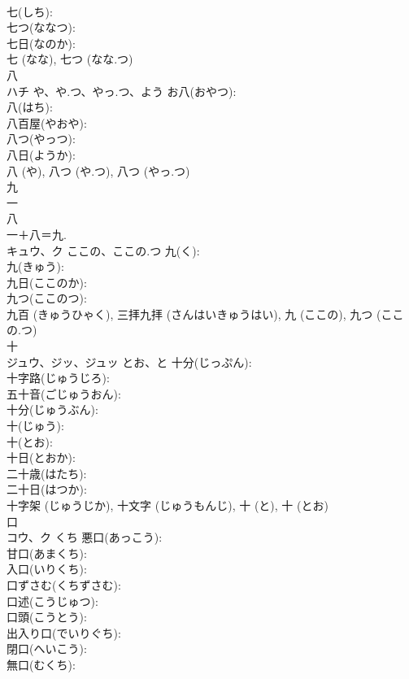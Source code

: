 \documentclass[8pt]{extreport}
\begin{document}
\begin{CJK}{UTF8}{min}
\\	七(しち): 
\\	七つ(ななつ): 
\\	七日(なのか): 
\\	七 (なな), 七つ (なな.つ)
\\	八			
\\	ハチ	や、や.つ、やっ.つ、よう	お八(おやつ): 
\\	八(はち): 
\\	八百屋(やおや): 
\\	八つ(やっつ): 
\\	八日(ようか): 
\\	八 (や), 八つ (や.つ), 八つ (やっ.つ)
\\	九			
\\	一 
\\	八
\\	一＋八＝九.	
\\	キュウ、ク	ここの、ここの.つ	九(く): 
\\	九(きゅう): 
\\	九日(ここのか): 
\\	九つ(ここのつ): 
\\	九百 (きゅうひゃく), 三拝九拝 (さんはいきゅうはい), 九 (ここの), 九つ (ここの.つ)
\\	十			
\\	ジュウ、ジッ、ジュッ	とお、と	十分(じっぷん): 
\\	十字路(じゅうじろ): 
\\	五十音(ごじゅうおん): 
\\	十分(じゅうぶん): 
\\	十(じゅう): 
\\	十(とお): 
\\	十日(とおか): 
\\	二十歳(はたち): 
\\	二十日(はつか): 
\\	十字架 (じゅうじか), 十文字 (じゅうもんじ), 十 (と), 十 (とお)
\\	口			
\\	コウ、ク	くち	悪口(あっこう): 
\\	甘口(あまくち): 
\\	入口(いりくち): 
\\	口ずさむ(くちずさむ): 
\\	口述(こうじゅつ): 
\\	口頭(こうとう): 
\\	出入り口(でいりぐち): 
\\	閉口(へいこう): 
\\	無口(むくち): 

\end{CJK}
\end{document}
